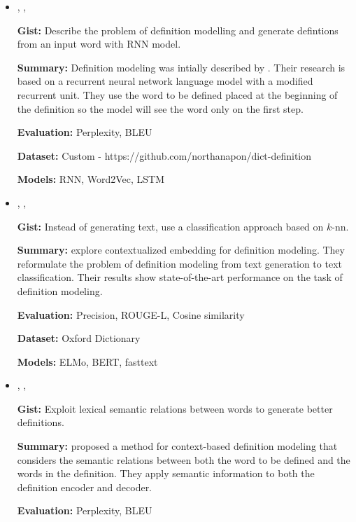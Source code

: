 \documentclass{article}[a4paper]
\newcommand{\bitem}[2]{
    \item[\cite{#1}]
        \citetitle{#1}, \citeauthor{#1}, \citeyear{#1}
        \newline
        {#2}
}%
\begin{document}
\begin{itemize}
    \bitem{noraset_definition_2016}%
    {%
        \textbf{Gist:}
        Describe the problem of definition modelling and generate defintions
        from an input word with RNN model.

        \textbf{Summary:}
        Definition modeling was intially described by
        \citeauthor{noraset_definition_2016}. Their research is based on a
        recurrent neural network language model \cite{mikolov_recurrent_2010}
        with a modified recurrent unit. They use the word to be defined placed
        at the beginning of the definition so the model will see the word only
        on the first step.

        \textbf{Evaluation:}
        Perplexity, BLEU

        \textbf{Dataset:}
        Custom - https://github.com/northanapon/dict-definition

        \textbf{Models:}
        RNN, Word2Vec, LSTM
    }%

    \bitem{chang_what_2019}%
    {%
        \textbf{Gist:}
        Instead of generating text, use a classification approach based on
        $k$-nn.

        \textbf{Summary:}
        \citeauthor{chang_what_2019} explore contextualized embedding for
        definition modeling. They reformulate the problem of definition modeling
        from text generation to text classification. Their results show
        state-of-the-art performance on the task of definition modeling.

        \textbf{Evaluation:}
        Precision, ROUGE-L, Cosine similarity

        \textbf{Dataset:}
        Oxford Dictionary

        \textbf{Models:}
        ELMo, BERT, fasttext
    }%

    \bitem{washio_bridging_2019}%
    {%
        \textbf{Gist:}
        Exploit lexical semantic relations between words to generate better
        definitions.

        \textbf{Summary:}
        \citeauthor{washio_bridging_2019} proposed a method for context-based
        definition modeling that considers the semantic relations between both
        the word to be defined and the words in the definition. They apply
        semantic information to both the definition encoder and decoder.

        \textbf{Evaluation:}
        Perplexity, BLEU

}
\end{itemize}
\end{document}
